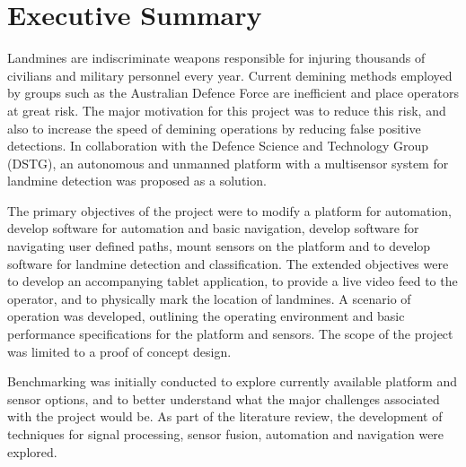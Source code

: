 \documentclass[main.tex]{subfiles}
\begin{document}

{}	%
\chapter*{Executive Summary}
  

Landmines are indiscriminate weapons responsible for injuring thousands of civilians and military personnel every year. Current demining methods employed by groups such as the Australian Defence Force are inefficient and place operators at great risk. The major motivation for this project was to reduce this risk, and also to increase the speed of demining operations by reducing false positive detections. In collaboration with the Defence Science and Technology Group (DSTG), an autonomous and unmanned platform with a multisensor system for landmine detection was proposed as a solution. 

The primary objectives of the project were to modify a platform for automation, develop software for automation and basic navigation, develop software for navigating user defined paths, mount sensors on the platform and to develop software for landmine detection and classification. The extended objectives were to develop an accompanying tablet application, to provide a live video feed to the operator, and to physically mark the location of landmines. A scenario of operation was developed, outlining the operating environment and basic performance specifications for the platform and sensors. The scope of the project was limited to a proof of concept design.

Benchmarking was initially conducted to explore currently available platform and sensor options, and to better understand what the major challenges associated with the project would be. As part of the literature review, the development of techniques for signal processing, sensor fusion, automation and navigation were explored.        
\end{document}
